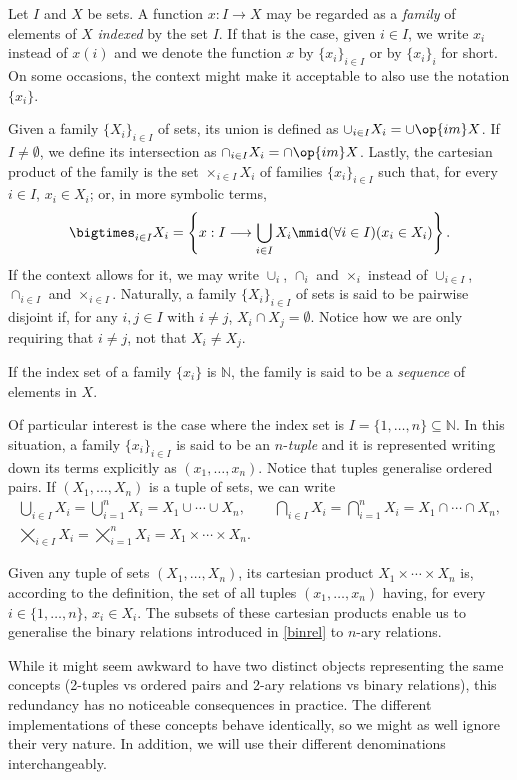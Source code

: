 \begin{definition}
Let $I$ and $X$ be sets. A function $x:I\longrightarrow X$ may be regarded as a \emph{family} of elements of $X$ \emph{indexed} by the set $I$.
If that is the case, given $i\in I$, we write $x_i$ instead of $x(i)$ and we denote the function $x$ by $\{x_i\}_{i\in I}$ or by $\{x_i\}_i$ for short. 
On some occasions, the context might make it acceptable to also use the notation $\{x_i\}$.

Given a family $\{X_i\}_{i\in I}$ of sets, its union is defined as $\cup_{i\in I} X_i = \cup \op{im} X$.
If $I\neq \emptyset$, we define its intersection as $\cap_{i\in I} X_i = \cap \op{im} X$.
Lastly, the cartesian product of the family is the set $\times_{i\in I} X_i$ of families $\{x_i\}_{i\in I}$ such that, for every $i\in I$, $x_i \in X_i$; or, in more symbolic terms,
\[ \bigtimes_{i\in I} X_i= \left\{x : I \longrightarrow \bigcup_{i\in I} X_i \mmid (\forall i\in I)(x_i\in X_i)\right\}.\] 
If the context allows for it, we may write $\cup_i$, $\cap_i$ and $\times_i$ instead of $\cup_{i\in I}$, $\cap_{i\in I}$ and $\times_{i\in I}$.
Naturally, a family $\{X_i\}_{i\in I}$ of sets is said to be pairwise disjoint if, for any $i,j\in I$ with $i\neq j$, $X_i \cap X_j = \emptyset$. Notice how we are only requiring that $i\neq j$, not that $X_i\neq X_j$.

If the index set of a family $\{x_i\}$ is $\mathbb{N}$, the family is said to be a \emph{sequence} of elements in $X$.

Of particular interest is the case where the index set is $I = \{1,\ldots,n\}\subseteq \mathbb{N}$.
In this situation, a family $\{x_i\}_{i\in I}$ is said to be an $n$-\emph{tuple} and it is represented writing down its terms explicitly as $(x_1,\ldots,x_n)$. Notice that tuples generalise ordered pairs. 
If $(X_1,\ldots,X_n)$ is a tuple of sets, we can write
\begin{gather*}
\bigcup_{i\in I} X_i = \bigcup_{i=1}^n X_i = X_1\cup \cdots \cup X_n,\qquad \bigcap_{i\in I} X_i = \bigcap_{i=1}^n X_i = X_1 \cap \cdots \cap X_n,\\
\bigtimes_{i\in I} X_i = \bigtimes_{i=1}^n X_i = X_1\times\cdots\times X_n.
\end{gather*} 

Given any tuple of sets $(X_1,\ldots,X_n)$, its cartesian product $X_1\times \cdots\times X_n$ is, according to the definition, the set of all tuples $(x_1,\ldots,x_n)$ having, for every $i\in\{1,\ldots,n\}$, $x_i\in X_i$. 
The subsets of these cartesian products enable us to generalise the binary relations introduced in \ref{binrel} to $n$-ary relations.

While it might seem awkward to have two distinct objects representing the same concepts (2-tuples vs ordered pairs and 2-ary relations vs binary relations), this redundancy has no noticeable consequences in practice.
The different implementations of these concepts behave identically, so we might as well ignore their very nature.
In addition, we will use their different denominations interchangeably.
\label{<+label+>}
\end{definition}

